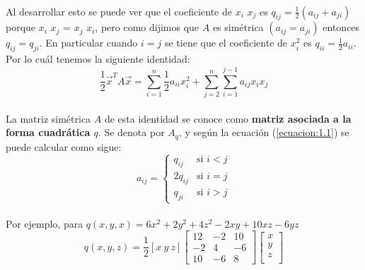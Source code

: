 \paragraph*{}
Al desarrollar esto se puede ver que el coeficiente de $x_{i}$ $x_{j}$ es $q_{ij} = \frac{1}{2} \left(a_{ij} + a_{ji} \right)$ porque $x_{i}$ $x_{j}$ = $x_{j}$ $x_{i}$, pero como dijimos que $A$ es simétrica $\left( a_{ij} = a_{ji}\right)$ entonces $q_{ij} = q_{ji}$. En particular cuando $i = j$ se tiene que el coeficiente de $x_{i}^{2}$ es $q_{ii} = \frac{1}{2}a_{ii}$. Por lo cuál tenemos la siguiente identidad:
\begin{equation}
    \frac{1}{2} \overrightarrow{x}^{T} A \overrightarrow{x} = \sum_{i=1}^{n}\frac{1}{2} a_{ii}x_{i}^{2} + \sum_{j=2}^{n}\sum_{i=1}^{j-1} a_{ij}x_{i}x_{j}
    \label{ecuacion:1.1}
\end{equation}
\paragraph*{}
La matriz simétrica $A$ de esta identidad se conoce como \textbf{matriz asociada a la forma cuadrática $q$}. Se denota por \textbf{$A_{q}$}, y según la ecuación (\ref{ecuacion:1.1}) se puede calcular como sigue:
\begin{equation}
a_{ij} = \left \{ 
    \begin{matrix} 
    q_{ij} & \mbox{si } i < j\\
    2q_{ij} & \mbox{si } i = j\\ 
    q_{ji} & \mbox{si } i > j
    \end{matrix}\right.
    \label{ecuacion:1.2}
\end{equation}
\paragraph*{}
Por ejemplo, para $q(x, y, x) = 6x^{2} + 2y^{2} + 4z^{2} - 2xy + 10xz - 6yz$
\begin{equation*}
q(x, y, z) = \frac{1}{2}\left[x ~  y ~ z\right] 
\begin{bmatrix}
12 & -2 & 10\\
-2 & 4 & -6\\
10 & -6 & 8
\end{bmatrix}
\begin{bmatrix}
x\\
y\\
z\\
\end{bmatrix}
\end{equation*}

